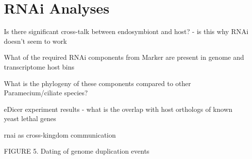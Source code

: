 \graphicspath{{chapters/7.Chapter_5/figures}}

\chapter{RNAi Analyses}

Is there significant cross-talk between endosymbiont and host? - is this why RNAi doesn't seem to work

What of the required RNAi components from Marker are present in genome and transcriptome host bins

What is the phylogeny of these components compared to other Paramecium/ciliate species?

eDicer experiment results - what is the overlap with host orthologs of known yeast lethal genes

rnai as cross-kingdom communication \citep{Weiberg2015}



FIGURE 5. Dating of genome duplication events
